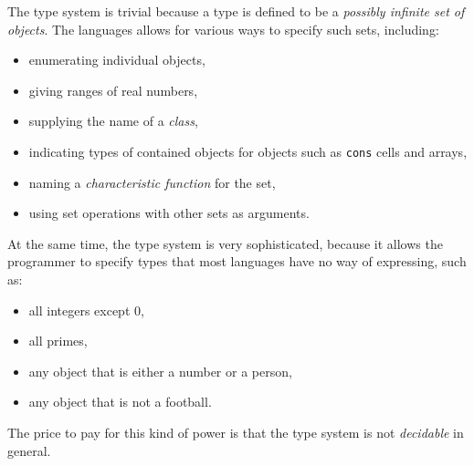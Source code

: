 The type system is trivial because a type is defined to be a
\emph{possibly infinite set of objects}.  The languages allows for
various ways to specify such sets, including:

\begin{itemize}
\item enumerating individual objects,
\item giving ranges of real numbers,
\item supplying the name of a \emph{class},
\item indicating types of contained objects for objects such as
  \texttt{cons} cells and arrays,
\item naming a \emph{characteristic function} for the set,
\item using set operations with other sets as arguments.
\end{itemize}

At the same time, the type system is very sophisticated, because it
allows the programmer to specify types that most languages have no way
of expressing, such as:

\begin{itemize}
\item all integers except 0,
\item all primes,
\item any object that is either a number or a person,
\item any object that is not a football.
\end{itemize}

The price to pay for this kind of power is that the \commonlisp{} type
system is not \emph{decidable} in general.

